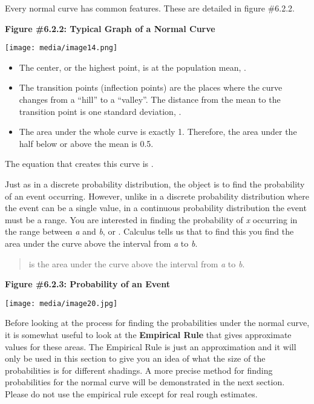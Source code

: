 \documentclass[]{book}
\begin{document}
Every normal curve has common features. These are detailed in figure
\#6.2.2.

\textbf{Figure \#6.2.2: Typical Graph of a Normal Curve}

\texttt{[image: media/image14.png]}

\begin{itemize}
\item
  The center, or the highest point, is at the population mean, .
\item
  The transition points (inflection points) are the places where the
  curve changes from a ``hill'' to a ``valley''. The distance from the
  mean to the transition point is one standard deviation, .
\item
  The area under the whole curve is exactly 1. Therefore, the area
  under the half below or above the mean is 0.5.
\end{itemize}

The equation that creates this curve is .

Just as in a discrete probability distribution, the object is to find
the probability of an event occurring. However, unlike in a discrete
probability distribution where the event can be a single value, in a
continuous probability distribution the event must be a range. You are
interested in finding the probability of \emph{x} occurring in the range
between \emph{a} and \emph{b}, or . Calculus tells us that to find this you find
the area under the curve above the interval from \emph{a} to \emph{b}.

\begin{quote}
is the area under the curve above the interval from \emph{a} to \emph{b}.
\end{quote}

\textbf{Figure \#6.2.3: Probability of an Event}

\texttt{[image: media/image20.jpg]}

Before looking at the process for finding the probabilities under the
normal curve, it is somewhat useful to look at the \textbf{Empirical Rule}
that gives approximate values for these areas. The Empirical Rule is
just an approximation and it will only be used in this section to give
you an idea of what the size of the probabilities is for different
shadings. A more precise method for finding probabilities for the normal
curve will be demonstrated in the next section. Please do not use the
empirical rule except for real rough estimates.
\end{document}
